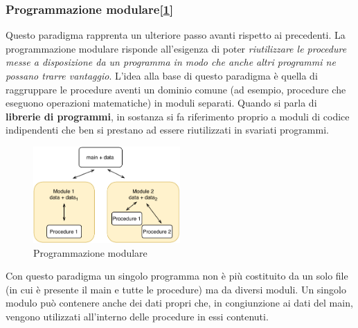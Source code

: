 \subsubsection{Programmazione modulare[\ref{fig:modular-programming}]}
Questo paradigma rapprenta un ulteriore passo avanti rispetto ai precedenti. La programmazione modulare risponde all'esigenza di poter \textit{riutilizzare le procedure messe a disposizione da un programma in modo che anche altri programmi ne possano trarre vantaggio}. L’idea alla base di questo paradigma è quella di raggruppare le procedure aventi un dominio comune (ad esempio, procedure che eseguono operazioni matematiche) in moduli separati. Quando si parla di \textbf{librerie di programmi}, in sostanza si fa riferimento proprio a moduli di codice indipendenti che ben si prestano ad essere riutilizzati in svariati programmi.
\begin{figure}[H]
    \centering
    \includegraphics[width=0.50\textwidth]{images/01_3_modular_programming.pdf}
    \caption{Programmazione modulare}
    \label{fig:modular-programming}
\end{figure}
Con questo paradigma un singolo programma non è più costituito da un solo file (in cui è presente il main e tutte le procedure) ma da diversi moduli. Un singolo modulo può contenere anche dei dati propri che, in congiunzione ai dati del main, vengono utilizzati all’interno delle procedure in essi contenuti.

